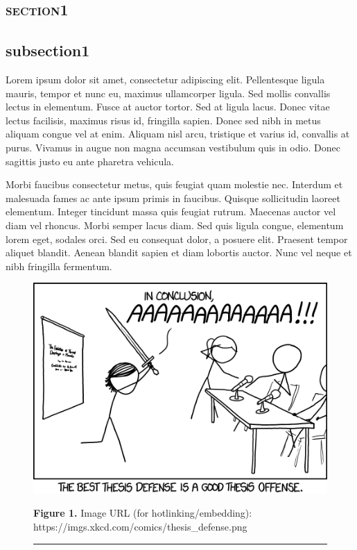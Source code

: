 \newpage
\begin{multicols}{2}
\section{\textsc{section1}}
\label{sec:sec01}
\vspace{-0.2cm}
\subsection{subsection1}
\vspace{-0.1cm}

 Lorem ipsum dolor sit amet,\cite{labelcite1} consectetur adipiscing elit. Pellentesque ligula mauris, tempor et nunc eu, maximus ullamcorper ligula. Sed mollis convallis lectus in elementum. Fusce at auctor tortor. Sed at ligula lacus. Donec vitae lectus facilisis, maximus risus id, fringilla sapien. Donec sed nibh in metus aliquam congue vel at enim. Aliquam nisl arcu, tristique et varius id, convallis at purus. Vivamus in augue non magna accumsan vestibulum quis in odio. Donec sagittis justo eu ante pharetra vehicula.

Morbi faucibus consectetur metus,\cite{labelcite1,labelcite3} quis feugiat quam molestie nec. Interdum et malesuada fames ac ante ipsum primis in faucibus. Quisque sollicitudin laoreet elementum. Integer tincidunt massa quis feugiat rutrum. Maecenas auctor vel diam vel rhoncus. Morbi semper lacus diam. Sed quis ligula congue, elementum lorem eget, sodales orci. Sed eu consequat dolor, a posuere elit. Praesent tempor aliquet blandit. Aenean blandit sapien et diam lobortis auctor. Nunc vel neque et nibh fringilla fermentum. 


\begin{figure}[H]
 \begin{center}
\vspace{-0.4cm} 
\includegraphics[width=0.45
\textwidth]{chapters/chapter-intro/fig-intro/thesisdefense.png}
 \end{center}
 \textbf{Figure 1.} \small{Image URL (for hotlinking/embedding):
https://imgs.xkcd.com/comics/thesis\_defense.png}  
\rule{0.49\textwidth}{1.0pt}
\end{figure}



\end{multicols}
